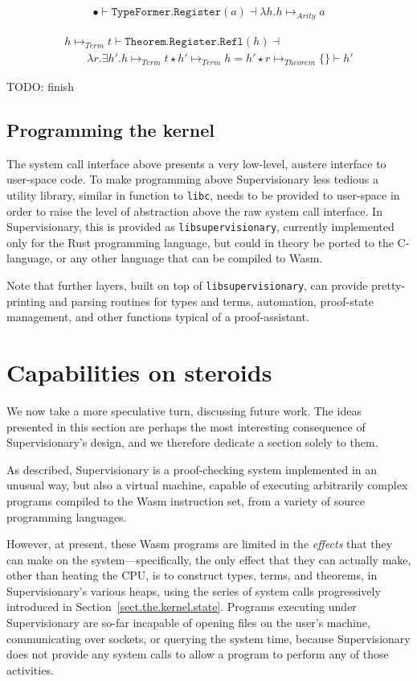 \documentclass[a4paper, UKenglish, cleveref, autoref, thm-restate, colorlinks]{lipics-v2021}
\newcommand{\todo}[1]{}
\renewcommand{\todo}[1]{{\color{red} TODO: {#1}}}
\newcommand{\lam}[1]{\lambda{#1}.}
\newcommand{\xsts}[1]{\exists{#1}.}
\begin{document}
\begin{gather*}
\bullet \vdash \mathtt{TypeFormer.Register}(a) \dashv \lam{h}h \mapsto_{Arity} a
\end{gather*}

\begin{gather*}
h \mapsto_{Term} t \vdash \mathtt{Theorem.Register.Refl}(h) \dashv \\
\qquad \lam{r}\xsts{h'}h \mapsto_{Term} t \star h' \mapsto_{Term} h = h' \star r \mapsto_{Theorem} \{\} \vdash h'
\end{gather*}

\todo{finish}

\subsection{Programming the kernel}

The system call interface above presents a very low-level, austere interface to user-space code.
To make programming above Supervisionary less tedious a utility library, similar in function to \texttt{libc}, needs to be provided to user-space in order to raise the level of abstraction above the raw system call interface.
In Supervisionary, this is provided as \texttt{libsupervisionary}, currently implemented only for the Rust programming language, but could in theory be ported to the C-language, or any other language that can be compiled to Wasm.

Note that further layers, built on top of \texttt{libsupervisionary}, can provide pretty-printing and parsing routines for types and terms, automation, proof-state management, and other functions typical of a proof-assistant.

\section{Capabilities on steroids}
\label{sect.capabilities.on.steroids}

We now take a more speculative turn, discussing future work.
The ideas presented in this section are perhaps the most interesting consequence of Supervisionary's design, and we therefore dedicate a section solely to them.

As described, Supervisionary is a proof-checking system implemented in an unusual way, but also a virtual machine, capable of executing arbitrarily complex programs compiled to the Wasm instruction set, from a variety of source programming languages.

However, at present, these Wasm programs are limited in the \emph{effects} that they can make on the system---specifically, the only effect that they can actually make, other than heating the CPU, is to construct types, terms, and theorems, in Supervisionary's various heaps, using the series of system calls progressively introduced in Section~\ref{sect.the.kernel.state}.
Programs executing under Supervisionary are so-far incapable of opening files on the user's machine, communicating over sockets, or querying the system time, because Supervisionary does not provide any system calls to allow a program to perform any of those activities.
\end{document}
